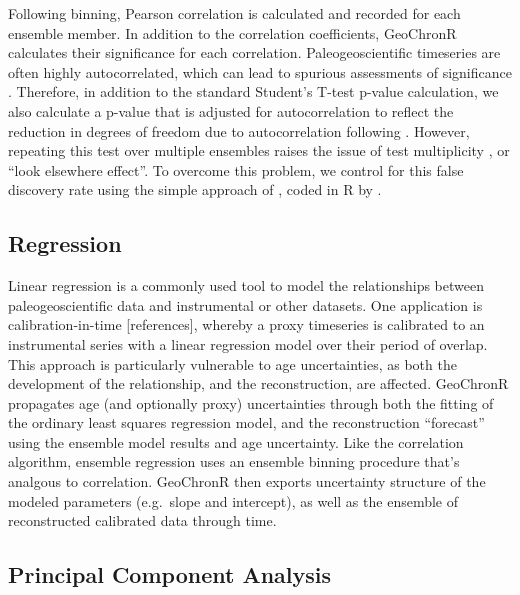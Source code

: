 \documentclass[gc, manuscript]{copernicus}
\begin{document}
Following binning, Pearson correlation is calculated and recorded for
each ensemble member. In addition to the correlation coefficients,
GeoChronR calculates their significance for each correlation.
Paleogeoscientific timeseries are often highly autocorrelated, which can
lead to spurious assessments of significance \citep{Hu_epsl17}.
Therefore, in addition to the standard Student's T-test p-value
calculation, we also calculate a p-value that is adjusted for
autocorrelation to reflect the reduction in degrees of freedom due to
autocorrelation following \citet{bretherton1999}. However, repeating
this test over multiple ensembles raises the issue of test multiplicity
\citep{Ventura2004}, or ``look elsewhere effect''. To overcome this
problem, we control for this false discovery rate using the simple
approach of \citet{BenjaminiHochberg95}, coded in R by
\citet{Ventura2004}.

\subsection{Regression}

Linear regression is a commonly used tool to model the relationships
between paleogeoscientific data and instrumental or other datasets. One
application is calibration-in-time {[}references{]}, whereby a proxy
timeseries is calibrated to an instrumental series with a linear
regression model over their period of overlap. This approach is
particularly vulnerable to age uncertainties, as both the development of
the relationship, and the reconstruction, are affected. GeoChronR
propagates age (and optionally proxy) uncertainties through both the
fitting of the ordinary least squares regression model, and the
reconstruction ``forecast'' using the ensemble model results and age
uncertainty. Like the correlation algorithm, ensemble regression uses an
ensemble binning procedure that's analgous to correlation. GeoChronR
then exports uncertainty structure of the modeled parameters (e.g.~slope
and intercept), as well as the ensemble of reconstructed calibrated data
through time.

\subsection{Principal Component Analysis}
\end{document}
